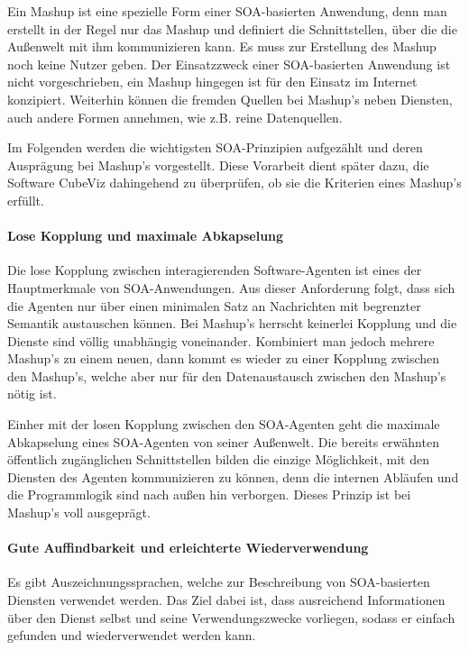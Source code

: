 \documentclass[11pt]{article}
\newcommand{\com}[1]{\marginpar{\em {\small{#1}}}} %
\begin{document}
Ein Mashup ist eine spezielle Form einer SOA-basierten Anwendung, denn man erstellt in der Regel nur das Mashup und definiert die Schnittstellen, über die die Außenwelt mit ihm kommunizieren kann. Es muss zur Erstellung des Mashup noch keine Nutzer geben. Der Einsatzzweck einer SOA-basierten Anwendung ist nicht vorgeschrieben, ein Mashup hingegen ist für den Einsatz im Internet konzipiert. Weiterhin können die fremden Quellen bei Mashup's neben Diensten, auch andere Formen annehmen, wie z.B. reine Datenquellen. \cite[S. 2]{MASHUP-ELUCID}

Im Folgenden werden die wichtigsten SOA-Prinzipien aufgezählt und deren Ausprägung bei Mashup's vorgestellt. Diese Vorarbeit dient später dazu, die Software \mbox{CubeViz} dahingehend zu überprüfen, ob sie die Kriterien eines Mashup's erfüllt.


%
%
\paragraph{Lose Kopplung und maximale Abkapselung} 

Die lose Kopplung\com{Auflistung \\ der SOA- \\Prinzipien} zwischen interagierenden Software-Agenten ist eines der Hauptmerkmale von SOA-Anwendungen. Aus dieser Anforderung folgt, dass sich die Agenten nur über einen minimalen Satz an Nachrichten mit begrenzter Semantik austauschen können. Bei Mashup's herrscht keinerlei Kopplung und die Dienste sind völlig unabhängig voneinander. Kombiniert man jedoch mehrere Mashup's zu einem neuen, dann kommt es wieder zu einer Kopplung zwischen den Mashup's, welche aber nur für den Datenaustausch zwischen den Mashup's nötig ist. 

Einher mit der losen Kopplung zwischen den SOA-Agenten geht die maximale Abkapselung eines SOA-Agenten von seiner Außenwelt. Die bereits erwähnten öffentlich zugänglichen Schnittstellen bilden die einzige Möglichkeit, mit den Diensten des Agenten kommunizieren zu können, denn die internen Abläufen und die  Programmlogik sind nach außen hin verborgen. Dieses Prinzip ist bei Mashup's voll ausgeprägt. \cite[S. 2]{MASHUP-ELUCID} \cite[S. 2]{SOA-WHAT-IS}

\paragraph{Gute Auffindbarkeit und erleichterte Wiederverwendung} 

Es gibt Auszeichnungssprachen, welche zur Beschreibung von SOA-basierten Diensten verwendet werden. Das Ziel dabei ist, dass ausreichend Informationen über den Dienst selbst und seine Verwendungszwecke vorliegen, sodass er einfach gefunden und wiederverwendet werden kann. 
\end{document}
